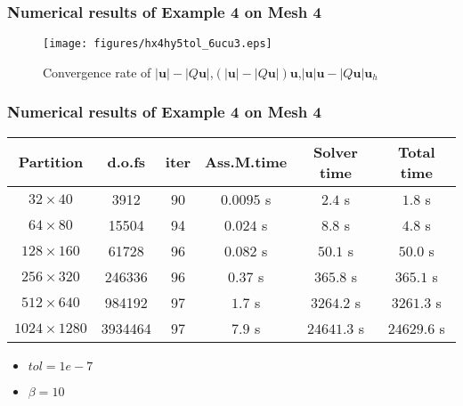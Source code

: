 \documentclass[notheorems,serif]{beamer}
\begin{document}
\begin{frame}
\frametitle{Numerical results of Example 4 on Mesh 4}
\begin{figure}[H] 
\centering 
\texttt{[image: figures/hx4hy5tol\_6ucu3.eps]} 
\caption{Convergence rate of $\left|\boldsymbol{u}\right|-\left|Q\boldsymbol{u}\right|$,$(\left|\boldsymbol{u}\right|-\left|Q\boldsymbol{u}\right|)\boldsymbol{u}$,$\left|\boldsymbol{u}\right|\boldsymbol{u}-\left|Q\boldsymbol{u}\right|\boldsymbol{u}_h$}
\label{fig:normumesh4p4} 
\end{figure}
\end{frame}

\begin{frame}
\frametitle{Numerical results of Example 4 on Mesh 4}
\begin{tabular}{ |c|c|c|c|c|c| }   
\hline   
Partition & d.o.fs & iter & Ass.M.time & Solver time & Total time \\
\hline
$32\times 40$ & 3912 & 90 & $0.0095$ s & $2.4$ s & $1.8$ s \\
$64\times 80$ & 15504 & 94 & $0.024$ s & $8.8$ s & $4.8$ s \\
$128\times 160$ & 61728 & 96 & $0.082$ s & $50.1$ s & $50.0$ s \\
$256\times 320$ & 246336 & 96 & $0.37$ s & $365.8$ s & $365.1$ s \\
$512\times 640$ & 984192 & 97 & $1.7$ s & $3264.2$ s & $3261.3$ s \\
$1024\times 1280$ & 3934464 & 97 & $7.9$ s & $24641.3$ s & $24629.6$ s \\
\hline 
\end{tabular}
\smallskip
\begin{itemize}
\item $tol = 1e-7$
\item $\beta = 10$
\end{itemize}
\end{frame}
\end{document}
